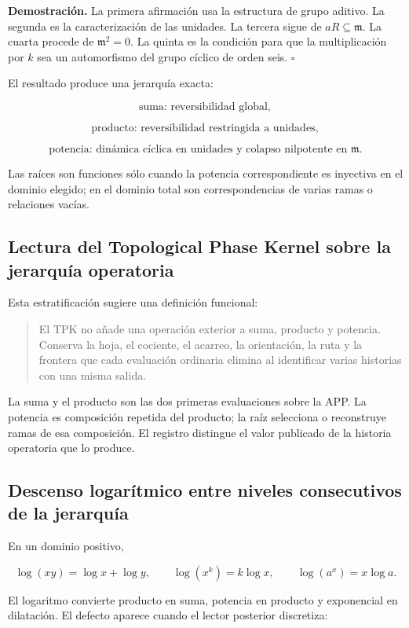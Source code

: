 \textbf{Demostración.} La primera afirmación usa la estructura de grupo aditivo. La segunda es la caracterización de las unidades. La tercera sigue de \(aR\subseteq\mathfrak m\). La cuarta procede de \(\mathfrak m^2=0\). La quinta es la condición para que la multiplicación por \(k\) sea un automorfismo del grupo cíclico de orden seis. \(\square\)

El resultado produce una jerarquía exacta:

\[
\text{suma: reversibilidad global},
\]

\[
\text{producto: reversibilidad restringida a unidades},
\]

\[
\text{potencia: dinámica cíclica en unidades y colapso nilpotente en }\mathfrak m.
\]

Las raíces son funciones sólo cuando la potencia correspondiente es inyectiva en el dominio elegido; en el dominio total son correspondencias de varias ramas o relaciones vacías.

\subsection{Lectura del Topological Phase Kernel sobre la jerarquía operatoria}

Esta estratificación sugiere una definición funcional:

\begin{quote}
El TPK no añade una operación exterior a suma, producto y potencia. Conserva la hoja, el cociente, el acarreo, la orientación, la ruta y la frontera que cada evaluación ordinaria elimina al identificar varias historias con una misma salida.
\end{quote}

La suma y el producto son las dos primeras evaluaciones sobre la APP. La potencia es composición repetida del producto; la raíz selecciona o reconstruye ramas de esa composición. El registro distingue el valor publicado de la historia operatoria que lo produce.

\subsection{Descenso logarítmico entre niveles consecutivos de la jerarquía}

En un dominio positivo,

\[
\log(xy)=\log x+\log y,\qquad
\log(x^k)=k\log x,\qquad
\log(a^x)=x\log a.
\]

El logaritmo convierte producto en suma, potencia en producto y exponencial en dilatación. El defecto aparece cuando el lector posterior discretiza:

